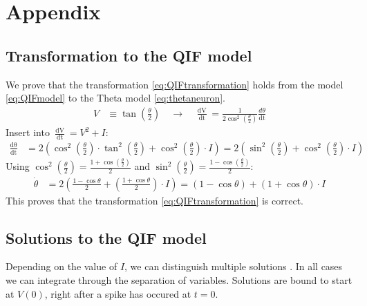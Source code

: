 
\newpage
\appendix
\section{Appendix} \label{sec:Appendix}

\subsection{Transformation to the QIF model} \label{app:TransformationToQIF}
We prove that the transformation \eqref{eq:QIFtransformation} holds from the \QIF model \eqref{eq:QIFmodel} to the Theta model \eqref{eq:thetaneuron}.
\begin{align*}
V &\equiv \tan \left( \frac{\theta}{2} \right) \quad \longrightarrow \quad
\frac{\mathop{d V}}{\mathop{d t}} = \frac{1}{2 \cos ^{2}\left(\frac{\theta}{2}\right)} \frac{d \theta}{ \mathop{d t}}
\end{align*}
Insert into $\frac{\mathop{d V}}{\mathop{d t}}= V^2 + I$:
\begin{align*}
\frac{\mathop{d \theta}}{\mathop{d t}} &= 2\left(\cos ^{2}\left(\frac{\theta}{2}\right) \cdot \tan ^{2}\left(\frac{\theta}{2}\right)+\cos ^{2}\left(\frac{\theta}{2}\right) \cdot I \right) = 2\left(\sin ^{2}\left(\frac{\theta}{2}\right)+\cos ^{2}\left(\frac{\theta}{2}\right) \cdot I \right)
\end{align*}
Using $\cos ^{2}\left(\frac{\theta}{2}\right) = \frac{1+\cos \left(\frac{\theta}{2}\right)}{2}$ and $\sin ^{2}\left(\frac{\theta}{2}\right)=\frac{1-\cos \left(\frac{\theta}{2}\right)}{2}$:
\begin{align*}
\dot{\theta} &=2\left(\frac{1-\cos \theta}{2}+\left(\frac{1+\cos \theta}{2}\right) \cdot I \right) =(1-\cos \theta)+(1+\cos \theta) \cdot I
\end{align*}
This proves that the transformation \eqref{eq:QIFtransformation} is correct.

 
\subsection{Solutions to the QIF model} \label{app:ThetaModelSolutions}
Depending on the value of $I$, we can distinguish multiple solutions  \cite{Perez2020}. In all cases we can integrate through the separation of variables. Solutions are bound to start at $V(0)$, right after a spike has occured at $t=0$. 

